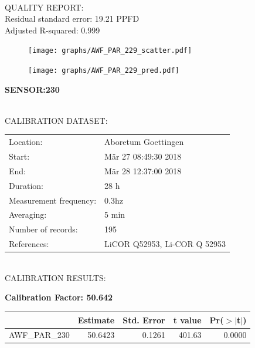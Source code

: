 \documentclass[oneside]{report}
\begin{document}
\hrulefill\\
QUALITY REPORT:\\
Residual standard error: 19.21 PPFD\\
Adjusted R-squared: 0.999



\begin{figure}[H]
  \centering
  \texttt{[image: graphs/AWF\_PAR\_229\_scatter.pdf]}
\end{figure}




\begin{figure}[H]
  \centering
  \texttt{[image: graphs/AWF\_PAR\_229\_pred.pdf]}
\end{figure}

\pagebreak


\begin{center}
\large{\textbf{SENSOR:230}}\\
\end{center}

\hrulefill\\
CALIBRATION DATASET:\\
\begin{table}[h!]
  \centering
  \label{tab:table1}
  \begin{tabular}{ll}
    Location: & Aboretum Goettingen\\ 
    
    
    Start:  & Mär 27 08:49:30 2018 \\
    End:   & Mär 28 12:37:00 2018\\ 
    Duration: & 28 h\\
    Measurement frequency: & 0.3hz\\
    Averaging:  &5 min\\
    Number of records: & 195 \\
    References: & LiCOR Q52953, Li-COR Q 52953 \\
  \end{tabular}
\end{table}

\hrulefill\\
CALIBRATION RESULTS:\\


\begin{center}
\textbf{\large{Calibration Factor: 50.642}}\\
\end{center}
\begin{table}[ht]
\centering
\begin{tabular}{rrrrr}
  \hline
 & Estimate & Std. Error & t value & Pr($>$$|$t$|$) \\ 
  \hline
AWF\_PAR\_230 & 50.6423 & 0.1261 & 401.63 & 0.0000 \\ 
   \hline
\end{tabular}
\end{table}
\end{document}
